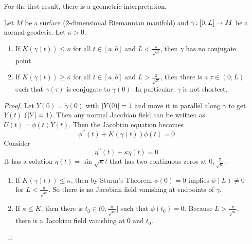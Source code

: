 \begin{enumerate}[label=\arabic{*}.]
	For the first result, there is a geometric interpretation.
	\begin{thm}[Bonnet]
		Let $M$ be a surface ($2$-dimensional Riemannian manifold) and $\gamma \colon [0,L] \rightarrow M$ be a normal geodesic. Let $\kappa > 0$.
		\begin{enumerate}[label=(\arabic{*})]
			\item If $K(\gamma(t)) \leq \kappa$ for all $t \in [a,b]$ and $L < \frac{\pi}{\sqrt{\kappa}}$, then $\gamma$ has no conjugate point.
			\item If $K(\gamma(t)) \geq \kappa$ for all $t \in [a,b]$ and $L > \frac{\pi}{\sqrt{\kappa}}$, then there is a $\tau \in (0,L)$ such that $\gamma(\tau)$ is conjugate to $\gamma(0)$. In particular, $\gamma$ is not shortest.
		\end{enumerate}
	\end{thm}
	\begin{proof}
		Let $Y(0) \perp \dot{\gamma}(0)$ with $\left\lvert Y(0)\right\lvert = 1$ and move it in parallel along $\gamma$ to get $Y(t)$ ($\left\lvert Y\right\lvert = 1$). Then any normal Jacobian field can be written as $U(t) = \phi(t)Y(t)$. Then the Jacobian equation becomes
		\begin{equation*}
			\phi^{\prime\prime}(t) + K(\gamma(t))\phi(t) = 0
		\end{equation*}
		Consider
		\begin{equation*}
			\eta^{\prime\prime}(t) + \kappa\eta(t) = 0
		\end{equation*}
		It has a solution $\eta(t) = \sin \sqrt{\kappa} t$ that has two continuous zeros at $0,\frac{\pi}{\sqrt{\kappa}}$.
		\begin{enumerate}[label=(\arabic{*})]
			\item If $K(\gamma(t)) \leq \kappa$, then by Sturm's Theorem $\phi(0) = 0$ implies $\phi(L) \neq 0$ for $L < \frac{\pi}{\sqrt{\kappa}}$. So there is no Jacobian field vanishing at endpoints of $\gamma$.

			\item If $\kappa \leq K$, then there is $t_0 \in (0,\frac{\pi}{\sqrt{\kappa}}]$ such that $\phi(t_0) = 0$. Because $L > \frac{\pi}{\sqrt{\kappa}}$, there is a Jacobian field vanishing at $0$ and $t_0$. \qedhere
		\end{enumerate}
	\end{proof}


\end{enumerate}
